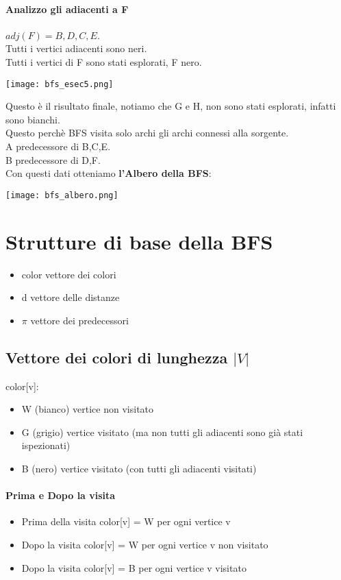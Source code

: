 \paragraph*{Analizzo gli adiacenti a F} \ra $adj(F) = B,D,C,E$.\\
Tutti i vertici adiacenti sono neri.\\
Tutti i vertici di F sono stati esplorati, F \ra nero.
\begin{center}
    \texttt{[image: bfs\_esec5.png]}
\end{center}
Questo è il risultato finale, notiamo che G e H, non sono stati esplorati, infatti sono bianchi.\\
Questo perchè BFS visita solo archi gli archi connessi alla sorgente.\\
A predecessore di B,C,E.\\
B predecessore di D,F.\\
Con questi dati otteniamo \textbf{l'Albero della BFS}:
\begin{center}
    \texttt{[image: bfs\_albero.png]}
\end{center}
\section{Strutture di base della BFS}
\begin{itemize}
    \item color \ra vettore dei colori
    \item d \ra vettore delle distanze
    \item $\pi$ \ra vettore dei predecessori
\end{itemize}
\subsection*{Vettore dei colori di lunghezza $|V|$}
color[v]:
\begin{itemize}
    \item W (bianco) \ra vertice non visitato
    \item G (grigio) \ra vertice visitato (ma non tutti gli adiacenti sono già
    stati ispezionati)
    \item B (nero) \ra vertice visitato (con tutti gli adiacenti visitati)
\end{itemize}
\paragraph*{Prima e Dopo la visita}
\begin{itemize}
    \item Prima della visita \ra color[v] = W per ogni vertice v
    \item Dopo la visita \ra color[v] = W per ogni vertice v non visitato
    \item Dopo la visita \ra color[v] = B per ogni vertice v visitato
\end{itemize}
